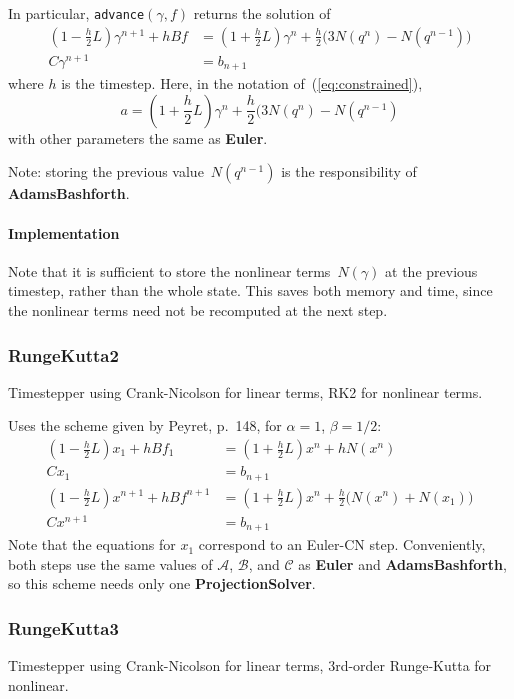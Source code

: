 \documentclass[11pt]{article}
\def\class#1{{\bf #1}} %
\def\fn#1{{\tt #1}} %
\begin{document}
In particular, \fn{advance}$(\gamma,f)$ returns the solution of
	\begin{align}
		(1-\frac{h}{2}L)\gamma^{n+1} + hBf &= (1 + \frac{h}{2}L)\gamma^n + \frac{h}{2} \big(3N(q^n) - N(q^{n-1})\big)\\
		C\gamma^{n+1} &= b_{n+1}
	\end{align}
where $h$ is the timestep.  Here, in the notation of~(\ref{eq:constrained}),
\begin{equation}
	a = (1+\frac{h}{2}L)\gamma^n + \frac{h}{2}(3N(q^n) - N(q^{n-1})
\end{equation}
with other parameters the same as \class{Euler}.

Note: storing the previous value~$N(q^{n-1})$ is the responsibility of \class{AdamsBashforth}.

\paragraph{Implementation}
Note that it is sufficient to store the nonlinear terms~$N(\gamma)$ at the previous timestep, rather than the whole state. This saves both memory and time, since the nonlinear terms need not be recomputed at the next step.

\subsubsection{RungeKutta2}
Timestepper using Crank-Nicolson for linear terms, RK2 for nonlinear terms.

Uses the scheme given by Peyret, p.~148\cite{Peyret:2002}, for $\alpha=1$, $\beta=1/2$:
\begin{align}
	(1 - \frac{h}{2}L)x_1 + hBf_1 &= (1+\frac{h}{2}L)x^n + hN(x^n)\\
	Cx_1 &= b_{n+1}\\
	(1-\frac{h}{2}L)x^{n+1} + hBf^{n+1} &= (1 + \frac{h}{2}L)x^n + \frac{h}{2}\big(N(x^n) + N(x_1)\big)\\
	Cx^{n+1} &= b_{n+1}
\end{align}
Note that the equations for $x_1$ correspond to an Euler-CN step.  Conveniently, both steps use the same values of $\mathcal{A}$, $\mathcal{B}$, and $\mathcal{C}$ as \class{Euler} and \class{AdamsBashforth}, so this scheme needs only one \class{ProjectionSolver}.

\subsubsection{RungeKutta3}
Timestepper using Crank-Nicolson for linear terms, 3rd-order Runge-Kutta for nonlinear.
\end{document}
